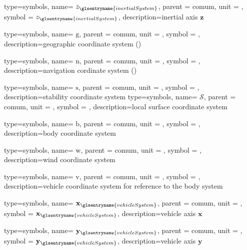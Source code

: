 {type=symbols,
  name= \ensuremath{z_{\glsentryname{inertialSystem}}},
  parent = {comum},
  unit = \unexpanded{},
  symbol = \ensuremath{z_{\glsentryname{inertialSystem}}},
  description={inertial axis $\mathbf{z}$}
}

{type=symbols,
  name= \ensuremath{\mathrm{g}},
  parent = {comum},
  unit = \unexpanded{},
  symbol = ,
  description={geographic coordinate system ()}
}

{type=symbols,
  name= \ensuremath{\mathrm{n}},
  parent = {comum},
  unit = \unexpanded{},
  symbol = ,
  description={navigation cordinate system  ()}
}

{type=symbols,
  name= \ensuremath{\mathrm{s}},
  parent = {comum},
  unit = \unexpanded{},
  symbol = ,
  description={stability coordinate system}
}
{type=symbols,
  name= \ensuremath{\mathcal{S}},
  parent = {comum},
  unit = \unexpanded{},
  symbol = ,
  description={local surface coordinate system}
}

{type=symbols,
  name= \ensuremath{\mathrm{b}},
  parent = {comum},
  unit = \unexpanded{},
  symbol = ,
  description={body coordinate system}
}

{type=symbols,
  name= \ensuremath{\mathrm{w}},
  parent = {comum},
  unit = \unexpanded{},
  symbol = ,
  description={wind coordinate system}
}

{type=symbols,
  name= \ensuremath{\mathrm{v}},
  parent = {comum},
  unit = \unexpanded{},
  symbol = ,
  description={vehicle coordinate system for reference to the body system}
}




{type=symbols,
  name= \ensuremath{\mathbf{x}_{\glsentryname{vehicleSystem}}},
  parent = {comum},
  unit = \unexpanded{},
  symbol = \ensuremath{\mathbf{x}_{\glsentryname{vehicleSystem}}},
  description={vehicle axis $\mathbf{x}$}
}

{type=symbols,
  name= \ensuremath{\mathbf{y}_{\glsentryname{vehicleSystem}}},
  parent = {comum},
  unit = \unexpanded{},
  symbol = \ensuremath{\mathbf{y}_{\glsentryname{vehicleSystem}}},
  description={vehicle axis $\mathbf{y}$}
}



